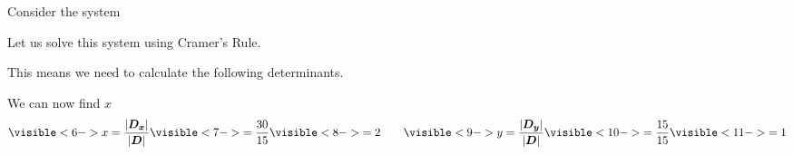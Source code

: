 \documentclass{beamer}
\begin{document}
\begin{frame}
\begin{example}
Consider the system
\begin{center}
\end{center}\pause
Let us solve this system using Cramer's Rule.

This means we need to calculate the following determinants.
\begin{center}
\end{center}
We can now find $x$ 
\begin{equation*}
\visible<6->{x=\dfrac{\abs{\mat{D_x}}}{\abs{\mat{D}}}\visible<7->{=\dfrac{30}{15}\visible<8->{=2}}}
\qquad
\visible<9->{y=\dfrac{\abs{\mat{D_y}}}{\abs{\mat{D}}}\visible<10->{=\dfrac{15}{15}\visible<11->{=1}}}
\end{equation*}
\end{example}
\end{frame}
\end{document}
